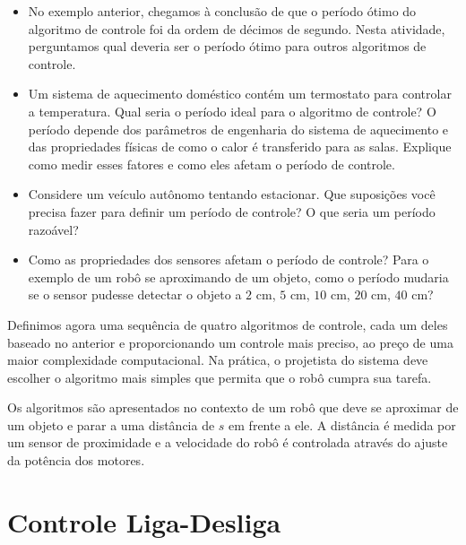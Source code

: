 \begin{framed}
\begin{itemize}
\item No exemplo anterior, chegamos à conclusão de que o período ótimo do algoritmo de controle foi da ordem de décimos de segundo. Nesta atividade, perguntamos qual deveria ser o período ótimo para outros algoritmos de controle.
\item Um sistema de aquecimento doméstico contém um termostato para controlar a temperatura. Qual seria o período ideal para o algoritmo de controle? O período depende dos parâmetros de engenharia do sistema de aquecimento e das propriedades físicas de como o calor é transferido para as salas. Explique como medir esses fatores e como eles afetam o período de controle.
\item Considere um veículo autônomo tentando estacionar. Que suposições você precisa fazer para definir um período de controle? O que seria um período razoável?
\item Como as propriedades dos sensores afetam o período de controle? Para o exemplo de um robô se aproximando de um objeto, como o período mudaria se o sensor pudesse detectar o objeto a $2$ cm, $5$ cm, $10$ cm, $20$ cm, $40$ cm?
\end{itemize}
\end{framed}

Definimos agora uma sequência de quatro algoritmos de controle, cada um deles baseado no anterior e proporcionando um controle mais preciso, ao preço de uma maior complexidade computacional. Na prática, o projetista do sistema deve escolher o algoritmo mais simples que permita que o robô cumpra sua tarefa.

Os algoritmos são apresentados no contexto de um robô que deve se aproximar de um objeto e parar a uma distância de $s$ em frente a ele. A distância é medida por um sensor de proximidade e a velocidade do robô é controlada através do ajuste da potência dos motores.


\section{Controle Liga-Desliga}\label{s.on-off}



